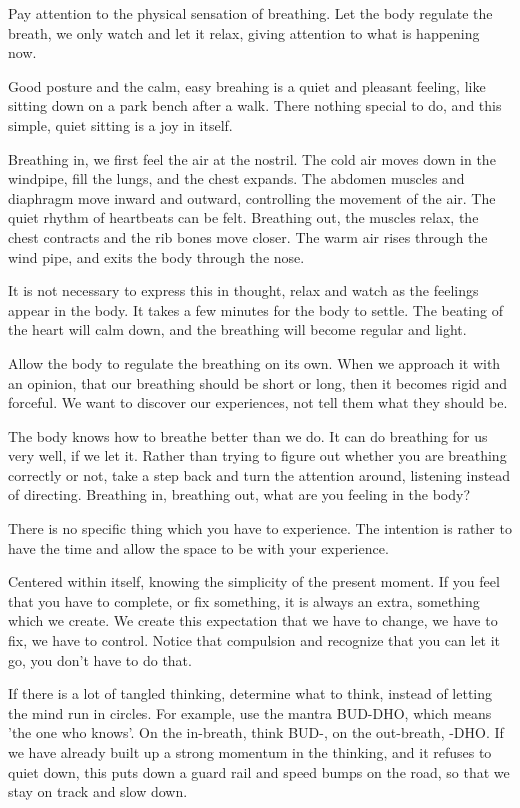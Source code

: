 Pay attention to the physical sensation of breathing. Let the body
regulate the breath, we only watch and let it relax, giving attention to
what is happening now.

Good posture and the calm, easy breahing is a quiet and pleasant
feeling, like sitting down on a park bench after a walk. There nothing
special to do, and this simple, quiet sitting is a joy in itself.

Breathing in, we first feel the air at the nostril. The cold air moves
down in the windpipe, fill the lungs, and the chest expands. The abdomen
muscles and diaphragm move inward and outward, controlling the movement
of the air. The quiet rhythm of heartbeats can be felt. Breathing out,
the muscles relax, the chest contracts and the rib bones move closer.
The warm air rises through the wind pipe, and exits the body through the
nose.

It is not necessary to express this in thought, relax and watch as the
feelings appear in the body. It takes a few minutes for the body to
settle. The beating of the heart will calm down, and the breathing will
become regular and light.

Allow the body to regulate the breathing on its own. When we approach it
with an opinion, that our breathing should be short or long, then it
becomes rigid and forceful. We want to discover our experiences, not
tell them what they should be.

The body knows how to breathe better than we do. It can do breathing for
us very well, if we let it. Rather than trying to figure out whether you
are breathing correctly or not, take a step back and turn the attention
around, listening instead of directing. Breathing in, breathing out,
what are you feeling in the body?

There is no specific thing which you have to experience. The intention
is rather to have the time and allow the space to be with your
experience.

Centered within itself, knowing the simplicity of the present moment. If
you feel that you have to complete, or fix something, it is always an
extra, something which we create. We create this expectation that we
have to change, we have to fix, we have to control. Notice that
compulsion and recognize that you can let it go, you don't have to do
that.

If there is a lot of tangled thinking, determine what to think, instead
of letting the mind run in circles. For example, use the mantra BUD-DHO,
which means 'the one who knows'. On the in-breath, think BUD-, on the
out-breath, -DHO. If we have already built up a strong momentum in the
thinking, and it refuses to quiet down, this puts down a guard rail and
speed bumps on the road, so that we stay on track and slow down.

